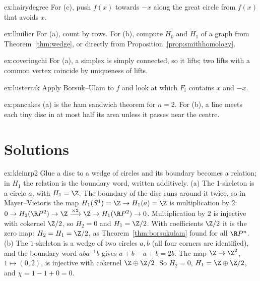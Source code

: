 \begin{hint}{ex:hairydegree}
For (c), push $f(x)$ towards $-x$ along the great circle from $f(x)$ that avoids $x$.
\end{hint}

\begin{hint}{ex:lhuilier}
For (a), count by rows. For (b), compute $H_0$ and $H_1$ of a graph from Theorem~\ref{thm:wedge}, or directly from Proposition~\ref{prop:smithhomology}.
\end{hint}

\begin{hint}{ex:coveringchi}
For (a), a simplex is simply connected, so it lifts; two lifts with a common vertex coincide by uniqueness of lifts.
\end{hint}

\begin{hint}{ex:lusternik}
Apply Borsuk--Ulam to $f$ and look at which $F_i$ contains $x$ and $-x$.
\end{hint}

\begin{hint}{ex:pancakes}
(a) is the ham sandwich theorem for $n=2$. For (b), a line meets each tiny disc in at most half its area unless it passes near the centre.
\end{hint}

\section{Solutions}

\begin{solution}{ex:kleinrp2}
\idea Glue a disc to a wedge of circles and its boundary becomes a relation; in $H_1$ the relation is the boundary word, written additively.
\writeup (a) The $1$-skeleton is a circle $a$, with $H_1=\Z$. The boundary of the disc runs around it twice, so in Mayer--Vietoris the map $H_1(S^1)=\Z\to H_1(a)=\Z$ is multiplication by $2$:
$0\to H_2(\R P^2)\to\Z\xrightarrow{\times2}\Z\to H_1(\R P^2)\to0$. Multiplication by $2$ is injective with cokernel $\Z/2$, so $H_2=0$ and $H_1=\Z/2$. With coefficients $\Z/2$ it is the zero map: $H_2=H_1=\Z/2$, as
Theorem~\ref{thm:borsukulam} found for all $\R P^n$. (b) The $1$-skeleton is a wedge of two circles $a,b$ (all four corners are identified), and the boundary word $aba^{-1}b$ gives $a+b-a+b=2b$. The map
$\Z\to\Z^2$, $1\mapsto(0,2)$, is injective with cokernel $\Z\oplus\Z/2$. So $H_2=0$, $H_1=\Z\oplus\Z/2$, and $\chi=1-1+0=0$.
\end{solution}

